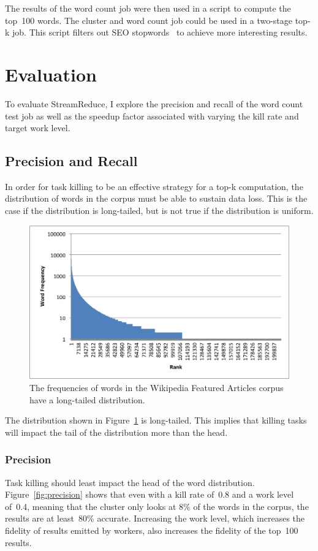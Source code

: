 \documentclass[12pt,twocolumn]{article}
\begin{document}
The results of the word count job were then used in a script to compute the top~100 words.
The cluster and word count job could be used in a two-stage top-k job. This script filters
out SEO stopwords~\cite{stopwords} to achieve more interesting results.

\section{Evaluation}
\label{sec:evaluation}
To evaluate StreamReduce, I explore the precision and recall of the word count test job as well as the
speedup factor associated with varying the kill rate and target work level.

\subsection{Precision and Recall}
In order for task killing to be an effective strategy for a top-k computation, the
distribution of words in the corpus must be able to sustain data loss. This is the case
if the distribution is long-tailed, but is not true if the distribution is uniform.

\begin{figure}
\includegraphics[width=\linewidth]{long-tail-ranks.png}
\caption{The frequencies of words in the Wikipedia Featured Articles corpus have a long-tailed distribution.}
\label{fig:wordDist}
\end{figure}

The distribution shown in Figure~\ref{fig:wordDist} is long-tailed. This implies that killing
tasks will impact the tail of the distribution more than the head.

\subsubsection{Precision}
Task killing should least impact the head of the word distribution.
Figure~\ref{fig:precision} shows that even with a kill rate of~0.8 and a work level of~0.4,
meaning that the cluster only looks at 8\% of the words in the corpus, the results
are at least~80\% accurate. Increasing the work level, which increases the fidelity of
results emitted by workers, also increases the fidelity of the top~100 results.
\end{document}
